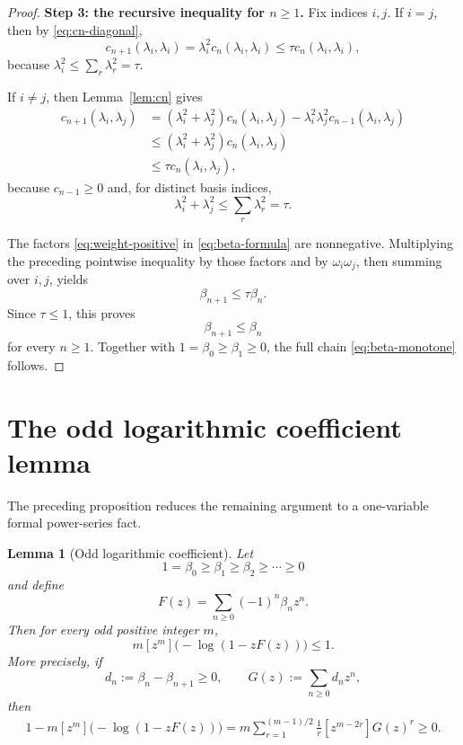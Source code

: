 \documentclass[11pt]{article}
\newtheorem{lemma}[theorem]{Lemma}
\begin{document}
\begin{proof}
\medskip
\noindent\textbf{Step 3: the recursive inequality for $n\ge1$.}
Fix indices $i,j$.  If $i=j$, then by \eqref{eq:cn-diagonal},
\[
   c_{n+1}(\lambda_i,\lambda_i)
   =\lambda_i^2c_n(\lambda_i,\lambda_i)
   \le\tau c_n(\lambda_i,\lambda_i),
\]
because $\lambda_i^2\le\sum_r\lambda_r^2=\tau$.

If $i\ne j$, then Lemma~\ref{lem:cn} gives
\begin{align*}
   c_{n+1}(\lambda_i,\lambda_j)
   &=(\lambda_i^2+\lambda_j^2)c_n(\lambda_i,\lambda_j)
     -\lambda_i^2\lambda_j^2c_{n-1}(\lambda_i,\lambda_j)\\
   &\le(\lambda_i^2+\lambda_j^2)c_n(\lambda_i,\lambda_j)\\
   &\le\tau c_n(\lambda_i,\lambda_j),
\end{align*}
because $c_{n-1}\ge0$ and, for distinct basis indices,
\[
   \lambda_i^2+\lambda_j^2\le\sum_r\lambda_r^2=\tau.
\]

The factors \eqref{eq:weight-positive} in \eqref{eq:beta-formula} are nonnegative.  Multiplying the preceding pointwise inequality by those factors and by $\omega_i\omega_j$, then summing over $i,j$, yields
\[
   \beta_{n+1}\le\tau\beta_n.
\]
Since $\tau\le1$, this proves
\[
   \beta_{n+1}\le\beta_n
\]
for every $n\ge1$.  Together with $1=\beta_0\ge\beta_1\ge0$, the full chain \eqref{eq:beta-monotone} follows.
\end{proof}

\section{The odd logarithmic coefficient lemma}

The preceding proposition reduces the remaining argument to a one-variable formal power-series fact.

\begin{lemma}[Odd logarithmic coefficient]\label{lem:odd-log}
Let
\[
   1=\beta_0\ge\beta_1\ge\beta_2\ge\cdots\ge0
\]
and define
\[
   F(z)=\sum_{n\ge0}(-1)^n\beta_nz^n.
\]
Then for every odd positive integer $m$,
\begin{equation}
   m[z^m]\bigl(-\log(1-zF(z))\bigr)\le1.
   \label{eq:odd-log-bound}
\end{equation}
More precisely, if
\[
   d_n:=\beta_n-\beta_{n+1}\ge0,
   \qquad
   G(z):=\sum_{n\ge0}d_nz^n,
\]
then
\begin{equation}
\begin{aligned}
 1-m[z^m]\bigl(-\log(1-zF(z))\bigr)
 =m\sum_{r=1}^{(m-1)/2}\frac1r
   [z^{m-2r}]G(z)^r
 \ge0.
   \label{eq:odd-log-identity}
\end{aligned}
\end{equation}
\end{lemma}
\end{document}
